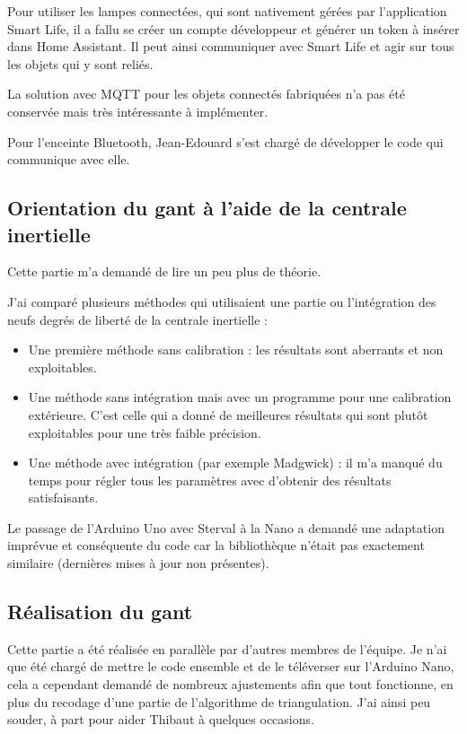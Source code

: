 \documentclass{article}
\begin{document}
            Pour utiliser les lampes connectées, qui sont nativement gérées par l'application Smart Life, il a fallu se créer un compte développeur
                et générer un token à insérer dans Home Assistant. Il peut ainsi communiquer avec Smart Life et agir sur tous les objets qui y sont reliés.

            La solution avec MQTT pour les objets connectés fabriquées n'a pas été conservée mais très intéressante à implémenter.

            Pour l'enceinte Bluetooth, Jean-Edouard s'est chargé de développer le code qui communique avec elle.

        \subsection{Orientation du gant à l'aide de la centrale inertielle}

            Cette partie m'a demandé de lire un peu plus de théorie.

            J'ai comparé plusieurs méthodes qui utilisaient une partie ou l'intégration des neufs degrés de liberté de la centrale inertielle :
            \begin{itemize}
                \item Une première méthode sans calibration : les résultats sont aberrants et non exploitables.
                \item Une méthode sans intégration mais avec un programme pour une calibration extérieure. C'est celle qui a donné de meilleures résultats 
                        qui sont plutôt exploitables pour une très faible précision.
                \item Une méthode avec intégration (par exemple Madgwick) : il m'a manqué du temps pour régler tous les paramètres avec d'obtenir des résultats satisfaisants.
            \end{itemize}
            
            Le passage de l'Arduino Uno avec Sterval à la Nano a demandé une adaptation imprévue et conséquente du code car la bibliothèque n'était pas exactement similaire
                (dernières mises à jour non présentes).
            
            
        \subsection{Réalisation du gant}
            Cette partie a été réalisée en parallèle par d'autres membres de l'équipe. 
            Je n'ai que été chargé de mettre le code ensemble et de le téléverser sur l'Arduino Nano, cela a cependant demandé
                de nombreux ajustements afin que tout fonctionne, en plus du recodage d'une partie de l'algorithme de triangulation.
            J'ai ainsi peu souder, à part pour aider Thibaut à quelques occasions.
\end{document}
